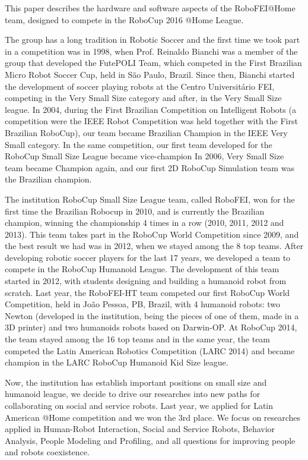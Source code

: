 This paper describes the hardware and software aspects of the RoboFEI@Home team, designed to compete in the RoboCup 2016 @Home League.

The group has a long tradition in Robotic Soccer and the first time we took part in a competition was in 1998, when Prof. Reinaldo Bianchi was a member of the group that developed the FutePOLI Team, which competed in the First Brazilian Micro Robot Soccer Cup, held in São Paulo, Brazil. Since then, Bianchi started the development of soccer playing robots at the Centro Universitário FEI, competing in the Very Small Size category and after, in the Very Small Size league. In 2004, during the First Brazilian Competition on Intelligent Robots (a competition were the IEEE Robot Competition was held together with the First Brazilian RoboCup), our team became Brazilian Champion in the IEEE Very Small category. In the same competition, our first team developed for the RoboCup Small Size League became vice-champion In 2006, Very Small Size team became Champion again, and our first 2D RoboCup Simulation team was the Brazilian champion.

The institution RoboCup Small Size League team, called RoboFEI, won for the first time the Brazilian Robocup in 2010, and is currently the Brazilian champion, winning the championship 4 times in a row (2010, 2011, 2012 and 2013). This team takes part in the RoboCup World Competition since 2009, and the best result we had was in 2012, when we stayed among the 8 top teams. After developing robotic soccer players for the last 17 years, we developed a team to compete in the RoboCup Humanoid League. The development of this team started in 2012, with students designing and building a humanoid robot from scratch. Last year, the RoboFEI-HT team competed our first RoboCup World Competition, held in João Pessoa, PB, Brazil, with 4 humanoid robots: two Newton (developed in the institution, being the pieces of one of them, made in a 3D printer) and two humanoids robots based on Darwin-OP. At RoboCup 2014, the team stayed among the 16 top teams and in the same year, the team competed the Latin American Robotics Competition (LARC 2014) and became champion in the LARC RoboCup Humanoid Kid Size league.

Now, the institution has establish important positions on small size and humanoid league, we decide to drive our researches into new paths for collaborating on social and service robots. Last year, we applied for Latin American @Home competition and we won the 3rd place. We focus on researches applied in Human-Robot Interaction, Social and Service Robots, Behavior Analysis, People Modeling and Profiling, and all questions for improving people and robots coexistence.